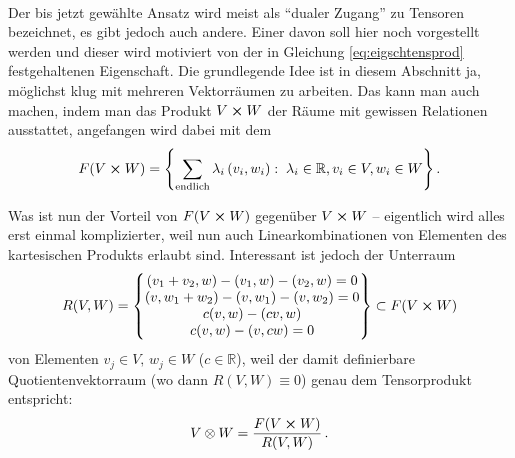 \documentclass[../H_Analysis_main.tex]{subfiles}
\begin{document}
	\\


Der bis jetzt gewählte Ansatz wird meist als \enquote{dualer Zugang} zu Tensoren bezeichnet, es gibt jedoch auch andere. Einer davon soll hier noch vorgestellt werden und dieser wird motiviert von der in Gleichung \eqref{eq:eigschtensprod} festgehaltenen Eigenschaft. Die grundlegende Idee ist in diesem Abschnitt ja, möglichst klug mit mehreren Vektorräumen zu arbeiten. Das kann man auch machen, indem man das Produkt $V \cross W$ der Räume mit gewissen Relationen ausstattet, angefangen wird dabei mit dem 
\begin{equation}
F(V \cross W) = \qty{\sum_{\text{endlich}} \lambda_i \, (v_i, w_i): \; \lambda_i \in \mathbb{R}, v_i \in V, w_i \in W} \, .
\end{equation}

Was ist nun der Vorteil von $F(V \cross W)$ gegenüber $V \cross W$ -- eigentlich wird alles erst einmal komplizierter, weil nun auch Linearkombinationen von Elementen des kartesischen Produkts erlaubt sind. Interessant ist jedoch der Unterraum
\begin{equation}
R(V, W) = \qty{\mqty{(v_1 + v_2, w) - (v_1, w) - (v_2, w) = 0 \\ (v, w_1 + w_2) - (v, w_1) - (v, w_2) = 0 \\ c(v, w) - (c v, w) \\ c(v, w) - (v, c w) = 0}} \subset F(V \cross W)
\end{equation}
von Elementen $v_j \in V, \, w_j \in W$ ($c \in \mathbb{R}$), weil der damit definierbare Quotientenvektorraum (wo dann $R(V, W) \equiv \qty{0}$) genau dem Tensorprodukt entspricht:
\begin{equation}
V \otimes W = \frac{F(V \cross W)}{R(V, W)} \, .
\end{equation}
\end{document}
